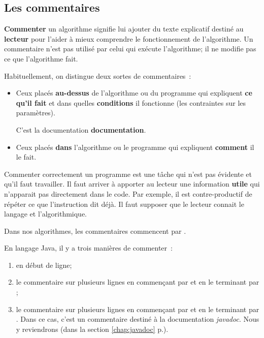 				
		\subsection{Les commentaires}
	
			\textbf{Commenter} un algorithme
			signifie lui ajouter du texte explicatif
			destiné au \textbf{lecteur} pour l’aider à mieux
			comprendre le fonctionnement de l’algorithme.
			Un commentaire n’est pas utilisé par celui qui exécute
			l’algorithme; il ne modifie pas ce que l’algorithme fait.
			
			Habituellement, on distingue deux sortes de commentaires~:
			\begin{itemize}
			\item
				Ceux placés \textbf{au-dessus} de l’algorithme ou du programme
				qui expliquent \textbf{ce qu'il fait} 
				et dans quelles \textbf{conditions} il fonctionne
				(les contraintes sur les paramètres).
				\par C'est la documentation \textbf{documentation}.
			\item
				Ceux placés \textbf{dans} l’algorithme ou le programme
				qui expliquent \textbf{comment} il le fait.
			\end{itemize}
			
			Commenter correctement un programme est une tâche qui n’est pas
			évidente et qu’il faut travailler.  Il faut arriver à apporter au
			lecteur une information \textbf{utile} qui n’apparait pas
			directement dans le code.  Par exemple, il est contre-productif de
			répéter ce que l’instruction dit déjà. Il faut supposer que le 
			lecteur connait le langage et l'algorithmique.   

			Dans nos algorithmes, les commentaires commencent par \pc{//}. 

			En langage Java, il y a trois manières de commenter~:

			\begin{enumerate}
				\item \pc{//} en début de ligne;
				\item le commentaire sur plusieurs lignes en commençant par 
					\pc{/*} et en le terminant par \pc{*/};
					

				\item le commentaire sur plusieurs lignes en commençant par 
					\pc{/**} et en le terminant par \pc{*/}. Dans ce cas, 
					c'est un commentaire destiné à la documentation 
					\textit{javadoc}. Nous y reviendrons (dans la section
					\ref{chap:javadoc} p.\pageref{chap:javadoc}). 
			\end{enumerate}
			
